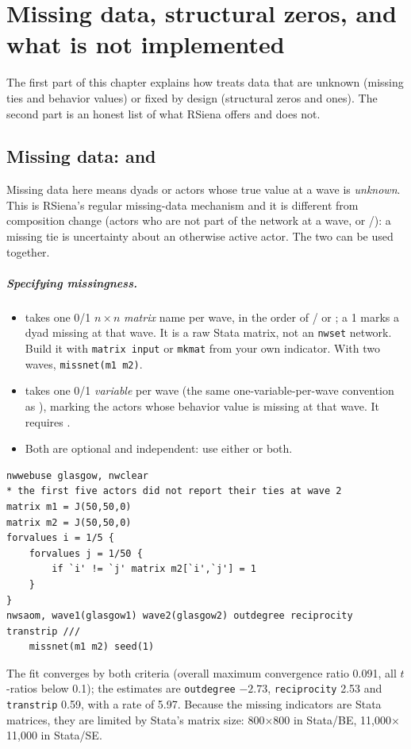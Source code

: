 \chapter{Missing data, structural zeros, and what is not implemented}\label{ch:missing}

The first part of this chapter explains how \nwsaom{} treats data that are unknown (missing ties and behavior values) or fixed by design (structural zeros and ones). The second part is an honest list of what RSiena offers and \nwsaom{} does not.

\section{Missing data:  and }\label{sec:missing}
Missing data here means dyads or actors whose true value at a wave is \emph{unknown}. This is RSiena's regular missing-data mechanism and it is different from composition change (actors who are not part of the network at a wave,  or /): a missing tie is uncertainty about an otherwise active actor. The two can be used together.

\paragraph{Specifying missingness.}
\begin{itemize}
\item {} takes one 0/1 $n\times n$ \emph{matrix} name per wave, in the order of / or ; a 1 marks a dyad missing at that wave. It is a raw Stata matrix, not an \texttt{nwset} network. Build it with \texttt{matrix input} or \texttt{mkmat} from your own indicator. With two waves, \texttt{missnet(m1 m2)}.
\item {} takes one 0/1 \emph{variable} per wave (the same one-variable-per-wave convention as ), marking the actors whose behavior value is missing at that wave. It requires .
\item Both are optional and independent: use either or both.
\end{itemize}
\begin{lstlisting}
nwwebuse glasgow, nwclear
* the first five actors did not report their ties at wave 2
matrix m1 = J(50,50,0)
matrix m2 = J(50,50,0)
forvalues i = 1/5 {
    forvalues j = 1/50 {
        if `i' != `j' matrix m2[`i',`j'] = 1
    }
}
nwsaom, wave1(glasgow1) wave2(glasgow2) outdegree reciprocity transtrip ///
    missnet(m1 m2) seed(1)
\end{lstlisting}
The fit converges by both criteria (overall maximum convergence ratio 0.091, all $t$-ratios below 0.1); the estimates are \texttt{outdegree} $-2.73$, \texttt{reciprocity} 2.53 and \texttt{transtrip} 0.59, with a rate of 5.97. Because the missing indicators are Stata matrices, they are limited by Stata's matrix size: 800$\times$800 in Stata/BE, 11,000$\times$11,000 in Stata/SE.

